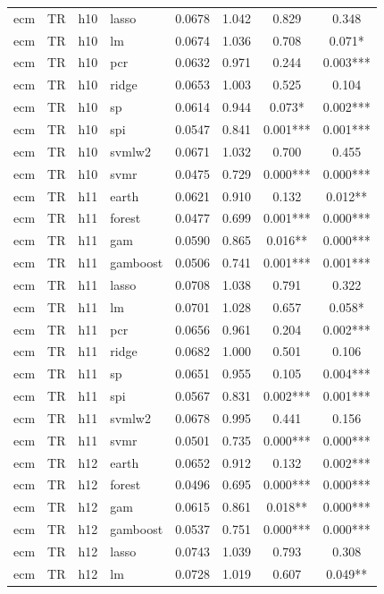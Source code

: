 \begin{ThreePartTable}
\begin{longtable}[t]{llclcccc}
ecm & TR & h10 & lasso & 0.0678 & 1.042 & 0.829 & 0.348\\
ecm & TR & h10 & lm & 0.0674 & 1.036 & 0.708 & 0.071*\\
ecm & TR & h10 & pcr & 0.0632 & 0.971 & 0.244 & 0.003***\\
ecm & TR & h10 & ridge & 0.0653 & 1.003 & 0.525 & 0.104\\
ecm & TR & h10 & sp & 0.0614 & 0.944 & 0.073* & 0.002***\\
ecm & TR & h10 & spi & 0.0547 & 0.841 & 0.001*** & 0.001***\\
ecm & TR & h10 & svmlw2 & 0.0671 & 1.032 & 0.700 & 0.455\\
ecm & TR & h10 & svmr & 0.0475 & 0.729 & 0.000*** & 0.000***\\
\addlinespace
ecm & TR & h11 & earth & 0.0621 & 0.910 & 0.132 & 0.012**\\
ecm & TR & h11 & forest & 0.0477 & 0.699 & 0.001*** & 0.000***\\
ecm & TR & h11 & gam & 0.0590 & 0.865 & 0.016** & 0.000***\\
ecm & TR & h11 & gamboost & 0.0506 & 0.741 & 0.001*** & 0.001***\\
ecm & TR & h11 & lasso & 0.0708 & 1.038 & 0.791 & 0.322\\
ecm & TR & h11 & lm & 0.0701 & 1.028 & 0.657 & 0.058*\\
ecm & TR & h11 & pcr & 0.0656 & 0.961 & 0.204 & 0.002***\\
ecm & TR & h11 & ridge & 0.0682 & 1.000 & 0.501 & 0.106\\
ecm & TR & h11 & sp & 0.0651 & 0.955 & 0.105 & 0.004***\\
ecm & TR & h11 & spi & 0.0567 & 0.831 & 0.002*** & 0.001***\\
ecm & TR & h11 & svmlw2 & 0.0678 & 0.995 & 0.441 & 0.156\\
ecm & TR & h11 & svmr & 0.0501 & 0.735 & 0.000*** & 0.000***\\
\addlinespace
ecm & TR & h12 & earth & 0.0652 & 0.912 & 0.132 & 0.002***\\
ecm & TR & h12 & forest & 0.0496 & 0.695 & 0.000*** & 0.000***\\
ecm & TR & h12 & gam & 0.0615 & 0.861 & 0.018** & 0.000***\\
ecm & TR & h12 & gamboost & 0.0537 & 0.751 & 0.000*** & 0.000***\\
ecm & TR & h12 & lasso & 0.0743 & 1.039 & 0.793 & 0.308\\
ecm & TR & h12 & lm & 0.0728 & 1.019 & 0.607 & 0.049**\\

\end{longtable}
\end{ThreePartTable}

